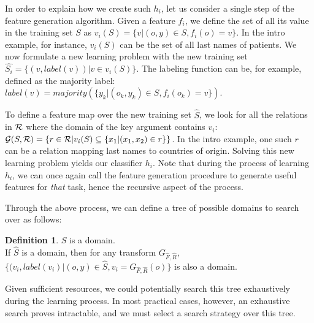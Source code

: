 \documentclass[letterpaper]{article}
\theoremstyle{definition}
\newtheorem{defn}{Definition}[section]
\begin{document}
In order to explain how we create such $h_{i}$, let us consider a single step of the feature generation algorithm.
Given a feature $f_{i}$, we define the set of all its value in the training set $S$ as $v_i(S) = \{v | (o,y) \in S, f_{i}(o)=v\}$. In the intro example, for instance, $v_i(S)$ can be the set of all last names of patients.
We now formulate a new learning problem with the new training set
$\hat{S_i} = \{ (v, label(v)) | v \in v_i(S) \}$.
The labeling function can be, for example, defined as
the majority label: $label(v)=majority(\{y_k| \left(o_k,y_k \right) \in S, f_{i}(o_k)=v\})$.

To define a feature map over the new training set $\hat{S}$, we look for all the relations in $\cal R$ where the domain of the key argument contains $v_i$:
${\cal G}(S,{\cal R}) = \left\{ r \in {\cal R} | v_i(S) \subseteq \{x_1 | (x_1,x_2) \in r\}\right\}$.  In the intro example, one such $r$ can be a relation mapping last names to countries of origin.
Solving this new learning problem yields our classifier $h_{i}$.
Note that during the process of learning $h_{i}$, we can once again call the feature generation procedure to generate useful features for \emph{that} task, hence the recursive aspect of the process.

Through the above process, we can define a tree of possible domains to search over as follows:
\begin{defn}%
$S$ is a domain.\\
If $\hat{S}$ is a domain, then for any transform $G_{\hat{F},\hat{R}}$, $\{(v_i,label(v_i)|(o,y)\in \hat{S}, v_i=G_{\hat{F},\hat{R}}(o)\}$ is also a domain.
\end{defn}
Given sufficient resources, we could potentially search this tree exhaustively during the learning process. In most practical cases, however, an exhaustive search proves intractable, and we must select a search strategy over this tree.

\end{document}
